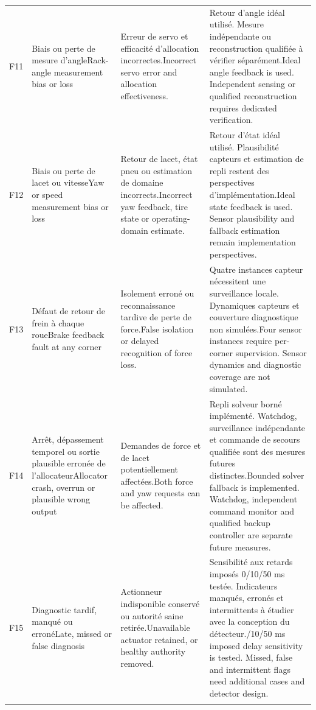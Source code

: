 \documentclass[11pt,a4paper,oneside]{report}
\newcommand{\bi}[2]{\iffrench #2\else #1\fi}
\begin{document}
\begin{longtable}{@{}p{12mm}>{\raggedright\arraybackslash}p{33mm}>{\raggedright\arraybackslash}p{42mm}>{\raggedright\arraybackslash}p{57mm}@{}}
F11 & \bi{Rack-angle measurement bias or loss}{Biais ou perte de mesure d'angle} & \bi{Incorrect servo error and allocation effectiveness.}{Erreur de servo et efficacité d'allocation incorrectes.} & \bi{Ideal angle feedback is used. Independent sensing or qualified reconstruction requires dedicated verification.}{Retour d'angle idéal utilisé. Mesure indépendante ou reconstruction qualifiée à vérifier séparément.}\\\addlinespace
F12 & \bi{Yaw or speed measurement bias or loss}{Biais ou perte de lacet ou vitesse} & \bi{Incorrect yaw feedback, tire state or operating-domain estimate.}{Retour de lacet, état pneu ou estimation de domaine incorrects.} & \bi{Ideal state feedback is used. Sensor plausibility and fallback estimation remain implementation perspectives.}{Retour d'état idéal utilisé. Plausibilité capteurs et estimation de repli restent des perspectives d'implémentation.}\\\addlinespace
F13 & \bi{Brake feedback fault at any corner}{Défaut de retour de frein à chaque roue} & \bi{False isolation or delayed recognition of force loss.}{Isolement erroné ou reconnaissance tardive de perte de force.} & \bi{Four sensor instances require per-corner supervision. Sensor dynamics and diagnostic coverage are not simulated.}{Quatre instances capteur nécessitent une surveillance locale. Dynamiques capteurs et couverture diagnostique non simulées.}\\\addlinespace
F14 & \bi{Allocator crash, overrun or plausible wrong output}{Arrêt, dépassement temporel ou sortie plausible erronée de l'allocateur} & \bi{Both force and yaw requests can be affected.}{Demandes de force et de lacet potentiellement affectées.} & \bi{Bounded solver fallback is implemented. Watchdog, independent command monitor and qualified backup controller are separate future measures.}{Repli solveur borné implémenté. Watchdog, surveillance indépendante et commande de secours qualifiée sont des mesures futures distinctes.}\\\addlinespace
F15 & \bi{Late, missed or false diagnosis}{Diagnostic tardif, manqué ou erroné} & \bi{Unavailable actuator retained, or healthy authority removed.}{Actionneur indisponible conservé ou autorité saine retirée.} & \bi{0/10/50 ms imposed delay sensitivity is tested. Missed, false and intermittent flags need additional cases and detector design.}{Sensibilité aux retards imposés 0/10/50 ms testée. Indicateurs manqués, erronés et intermittents à étudier avec la conception du détecteur.}\\\addlinespace

\end{longtable}
\end{document}
